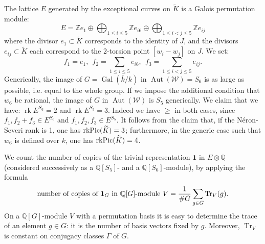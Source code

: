 \documentclass[a4paper,12pt]{amsart}
\begin{document}
 The lattice $E$ generated by the exceptional curves on ${\widetilde{{K}}}$ is a Galois permutation module:
\begin{equation}
E = {\mathbb{Z}} e_1 \oplus \bigoplus_{1 \leq i \leq 5} {\mathbb{Z}} e_{i6} \oplus \bigoplus_{1 \leq i < j \leq 5} {\mathbb{Z}} e_{ij} 
\end{equation}
where the divisor $e_1 \subset {\widetilde{K}}$ corresponds to the identity of $J$, and the divisors $e_{ij} \subset {\widetilde{K}}$ each correspond to the 2-torsion point $[w_i - w_j]$ on $J$. We set:
\begin{equation}
f_1 = e_1, ~~ f_2 = \sum_{1 \leq i \leq 5} e_{i6},~~ f_3 = \sum_{1 \leq i < j \leq 5} e_{ij}.
\end{equation}
Generically, the image of $G = \operatorname{Gal}({\overline{{k}}}/k)$ in ${\operatorname{Aut}}({\mathcal{W}}) = S_6$  is as large as possible, i.e. equal to the whole group. If we impose the additional condition that $w_6$ be rational, the image of $G$ in ${\operatorname{Aut}}({\mathcal{W}})$ is $S_5$ generically. We claim that we have: ${\operatorname{rk}} E^{S_6} = 2$ and ${\operatorname{rk}} E^{S_5} = 3$. Indeed we have $\geq$ in both cases, since $f_1,f_2+f_3 \in E^{S_6}$ and $f_1,f_2,f_3 \in E^{S_5}$. It follows from the claim that, if the N\'eron-Severi rank is 1,  one has ${\operatorname{rk}} {\textnormal{Pic}}({\widetilde{{K}}}) = 3$; furthermore, in the generic case such that $w_6$ is defined over $k$, one has ${\operatorname{rk}} {\textnormal{Pic}}({\widetilde{{K}}}) = 4$.

We count the number of copies of the trivial representation $\mathbf{1}$ in $E \otimes {\mathbb{Q}}$ (considered successively as a ${\mathbb{Q}}[S_5]$- and a ${\mathbb{Q}}[S_6]$-module), by applying the formula
\begin{equation}
\textnormal{number of copies of $\mathbf{1}_{G}$ in ${\mathbb{Q}}[G]$-module $V$} = \frac{1}{\# G} \sum_{g \in G} \operatorname{Tr}_V(g).
\end{equation}
On a ${\mathbb{Q}}[G]$-module $V$ with a permutation basis it is easy to determine the trace of an element $g \in G$: it is the number of basis vectors fixed by $g$. Moreover, $\operatorname{Tr}_V$ is constant on conjugacy classes $\Gamma$ of $G$. 
\end{document}
